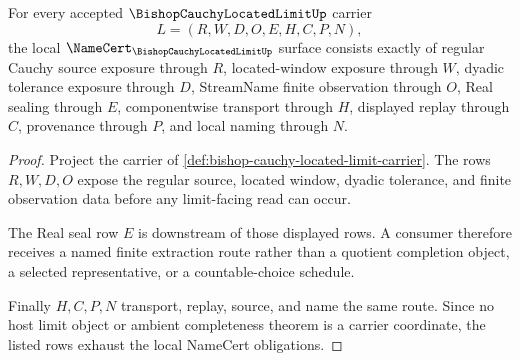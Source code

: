 \begin{theorem}
\label{thm:bishop-cauchy-located-limit-namecert-obligations}
For every accepted $\BishopCauchyLocatedLimitUp$ carrier
$$
L=(R,W,D,O,E,H,C,P,N),
$$
the local $\NameCert_{\BishopCauchyLocatedLimitUp}$ surface consists exactly of regular Cauchy source exposure through $R$, located-window exposure through $W$, dyadic tolerance exposure through $D$, StreamName finite observation through $O$, Real sealing through $E$, componentwise transport through $H$, displayed replay through $C$, provenance through $P$, and local naming through $N$.
\end{theorem}
\begin{proof}
Project the carrier of \autoref{def:bishop-cauchy-located-limit-carrier}. The rows $R,W,D,O$ expose the regular source, located window, dyadic tolerance, and finite observation data before any limit-facing read can occur.

The Real seal row $E$ is downstream of those displayed rows. A consumer therefore receives a named finite extraction route rather than a quotient completion object, a selected representative, or a countable-choice schedule.

Finally $H,C,P,N$ transport, replay, source, and name the same route. Since no host limit object or ambient completeness theorem is a carrier coordinate, the listed rows exhaust the local NameCert obligations.
\end{proof}


\begin{closurestatus}{\BishopCauchyLocatedLimitUp}
  \theoryclosure{\seedClosure}
  \formalstatus{\unformalizedV}
\end{closurestatus}
